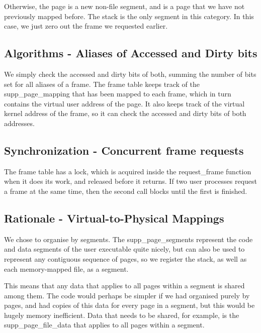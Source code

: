 Otherwise, the page is a new non-file segment, and is a page that we have not
previously mapped before. The stack is the only segment in this category.  In
this case, we just zero out the frame we requested earlier.

\subsection{Algorithms - Aliases of Accessed and Dirty bits}


We simply check the accessed and dirty bits of both, summing the number of bits
set for all aliases of a frame. The frame table keeps track of the
supp\_page\_mapping that has been mapped to each frame, which in turn contains
the virtual user address of the page. It also keeps track of the virtual kernel
address of the frame, so it can check the accessed and dirty bits of both
addresses.

\subsection{Synchronization - Concurrent frame requests}


The frame table has a lock, which is acquired inside the request\_frame
function when it does its work, and released before it returns. If two user
processes request a frame at the same time, then the second call blocks
until the first is finished.

\subsection{Rationale - Virtual-to-Physical Mappings}


We chose to organise by segments. The supp\_page\_segments represent the code
and data segments of the user executable quite nicely, but can also be used to
represent any contiguous sequence of pages, so we register the stack, as well as
each memory-mapped file, as a segment.

This means that any data that applies to all pages within a segment is shared
among them. The code would perhaps be simpler if we had organised purely by
pages, and had copies of this data for every page in a segment, but this would
be hugely memory inefficient. Data that needs to be shared, for example, is the
supp\_page\_file\_data that applies to all pages within a segment.

